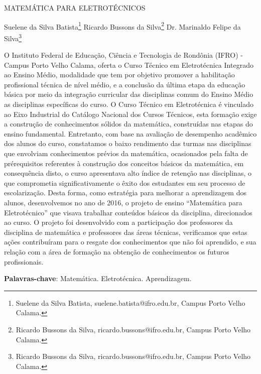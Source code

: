 \documentclass[article,12pt,onesidea,4paper,english,brazil]{abntex2}
\begin{document}
	
	
	\frenchspacing 
	
	\begin{center}
		\LARGE MATEMÁTICA PARA ELETROTÉCNICOS
		
		\normalsize
		Suelene da Silva Batista\footnote{Suelene da Silva Batista, suelene.batista@ifro.edu.br, Campus Porto Velho Calama.} 
	Ricardo Bussons da Silva\footnote{Ricardo Bussons da Silva, ricardo.bussons@ifro.edu.br, Campus Porto Velho Calama.} 
	Dr. Marinaldo Felipe da Silva\footnote{Ricardo Bussons da Silva, ricardo.bussons@ifro.edu.br, Campus Porto Velho Calama.} 
	\end{center}
	
	\noindent O Instituto Federal de Educação, Ciência e Tecnologia de Rondônia (IFRO) -
	Campus Porto Velho Calama, oferta o Curso Técnico em Eletrotécnica Integrado ao
	Ensino Médio, modalidade que tem por objetivo promover a habilitação profissional
	técnica de nível médio, e a conclusão da última etapa da educação básica por meio
	da integração curricular das disciplinas comum do Ensino Médio as disciplinas
	específicas do curso. O Curso Técnico em Eletrotécnica é vinculado ao Eixo
	Industrial do Catálogo Nacional dos Cursos Técnicos, esta formação exige a
	construção de conhecimentos sólidos da matemática, construídas nas etapas do
	ensino fundamental. Entretanto, com base na avaliação de desempenho acadêmico
	dos alunos do curso, constatamos o baixo rendimento das turmas nas disciplinas
	que envolviam conhecimentos prévios da matemática, ocasionados pela falta de prérequisitos
	referentes à construção dos conceitos básicos da matemática, em
	consequência disto, o curso apresentava alto índice de retenção nas disciplinas, o
	que comprometia significativamente o êxito dos estudantes em seu processo de
	escolarização. Desta forma, como estratégia para melhorar a aprendizagem dos
	alunos, desenvolvemos no ano de 2016, o projeto de ensino “Matemática para
	Eletrotécnico” que visava trabalhar conteúdos básicos da disciplina, direcionados ao
	curso. O projeto foi desenvolvido com a participação dos professores da disciplina
	de matemática e professores das áreas técnicas, verificamos que estas ações
	contribuíram para o resgate dos conhecimentos que não foi aprendido, e sua relação
	com a área de formação na obtenção de conhecimentos os futuros profissionais.
	
	\vspace{\onelineskip}
	
	\noindent
	\textbf{Palavras-chave}: Matemática. Eletrotécnica. Aprendizagem.
	
\end{document}
